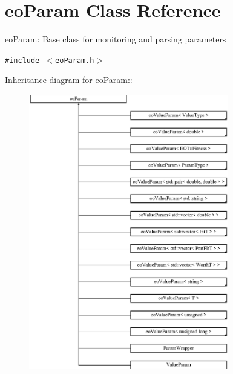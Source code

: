 \section{eo\-Param Class Reference}
\label{classeo_param}
eo\-Param: Base class for monitoring and parsing parameters  


{\tt \#include $<$eo\-Param.h$>$}

Inheritance diagram for eo\-Param::\begin{figure}[H]
\begin{center}
\leavevmode
\includegraphics[height=12cm]{classeo_param}
\end{center}
\end{figure}
